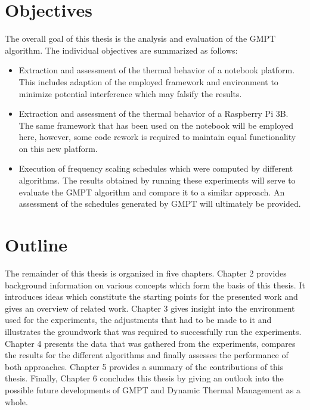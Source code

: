 \section{Objectives}
The overall goal of this thesis is the analysis and evaluation of the GMPT algorithm. The individual objectives are summarized as follows:
\begin{itemize}
\item Extraction and assessment of the thermal behavior of a notebook platform. This includes adaption of the employed framework and environment to minimize potential interference which may falsify the results.
\item Extraction and assessment of the thermal behavior of a Raspberry Pi 3B. The same framework that has been used on the notebook will be employed here, however,  some code rework is required to maintain equal functionality on this new platform.
\item Execution of frequency scaling schedules which were computed by different algorithms. The results obtained by running these experiments will serve to evaluate the GMPT algorithm and compare it to a similar approach. An assessment of the schedules generated by GMPT will ultimately be provided.
\end{itemize}
\section{Outline}
The remainder of this thesis is organized in five chapters. Chapter 2 provides background information on various concepts which form the basis of this thesis. It introduces ideas which constitute the starting points for the presented work and gives an overview of related work. Chapter 3 gives insight into the environment used for the experiments, the adjustments that had to be made to it and illustrates the groundwork that was required to successfully run the experiments. Chapter 4 presents the data that was gathered from the experiments, compares the results for the different algorithms and finally assesses the performance of both approaches. Chapter 5 provides a summary of the contributions of this thesis. Finally, Chapter 6 concludes this thesis by giving an outlook into the possible future developments of GMPT and Dynamic Thermal Management as a whole.
